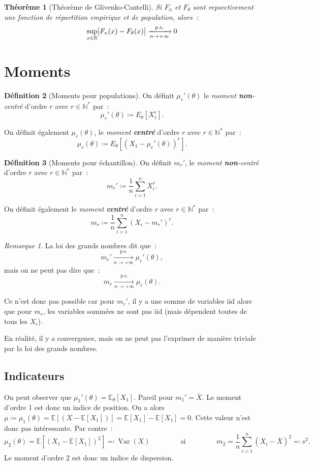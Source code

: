 \documentclass{report}
\DeclareMathOperator{\Var}{Var}
\newcommand{\E}{\mathbb E}
\newcommand{\pinfty}{{+\infty}}
\newcommand{\cvgps}{\xrightarrow[n \to \pinfty]{\text{p.s.}}}
\newcommand{\N}{\mathbb N}
\newcommand{\Ns}{\N^{*}}
\newcommand{\R}{\mathbb R}
\newtheorem{thm}{Théorème}[chapter]
\theoremstyle{definition}
\newtheorem{déf}[thm]{Définition}
\theoremstyle{remark}
\newtheorem*{rmq}{Remarque}
\begin{document}
		\begin{thm}[Théorème de Glivenko-Cantelli] Si $F_n$ et $F_\theta$ sont repsectivement une fonction de répartition empirique et de population, alors~:
		\[\sup_{x \in \R}\abs {F_n(x) - F_\theta(x)} \cvgps 0\]
		\end{thm}
	
	\section{Moments}
		\begin{déf}[Moments pour populations] On définit $\mu_r'(\theta)$ le \textit{moment \textbf{non}-centré} d'ordre $r$ avec $r \in \Ns$ par~:
		\[\mu_r'(\theta) \coloneqq E_\theta[X_1^r].\]

		On définit également $\mu_r(\theta)$, le \textit{moment \textbf{centré}} d'ordre $r$ avec $r \in \Ns$ par~:
		\[\mu_r(\theta) \coloneqq E_\theta\left[\left(X_1 - \mu_r'(\theta)\right)^r\right].\]
		\end{déf}

		\begin{déf}[Moments pour échantillon] On définit $m_r'$, le \textit{moment \textbf{non}-centré} d'ordre $r$ avec $r \in \Ns$ par~:
		\[m_r' \coloneqq \frac 1n\sum_{i=1}^n X_i^r.\]

		On définit également le \textit{moment \textbf{centré}} d'ordre $r$ avec $r \in \Ns$ par~:
		\[m_r \coloneqq \frac 1n\sum_{i=1}^n\left(X_i - m_r'\right)^r.\]
		\end{déf}

		\begin{rmq} La loi des grands nombres dit que~:
		\[m_r' \cvgps \mu_r'(\theta),\]
		mais on ne peut pas dire que~:
		\[m_r \cvgps \mu_r(\theta).\]

		Ce n'est donc pas possible car pour $m_r'$, il y a une somme de variables iid alors que pour $m_r$, les variables sommées ne sont pas iid (mais
		dépendent toutes de tous les $X_i$).
		
		En réalité, il y a convergence, mais on ne peut pas l'exprimer de manière triviale par la loi des grands nombres. \end{rmq}

		\subsection{Indicateurs}
			On peut observer que $\mu_1'(\theta) = \E_\theta[X_1]$. Pareil pour $m_1' = \overline X$. Le moment d'ordre 1 est donc un indice de position.
			On a alors $\mu \coloneqq \mu_1(\theta) = \E[(X - \E[X_1])] = \E[X_1] - \E[X_1] = 0$. Cette valeur n'est donc pas intéressante. Par contre~:
			\[\mu_2(\theta) = \E\left[(X_1 - \E[X_1])^2\right] \eqqcolon \Var(X) \qquad\qquad \text{ si }
				\qquad\qquad m_2 = \frac 1n\sum_{i=1}^n\left(X_i - \overline X\right)^2 \eqqcolon s^2.\]
			Le moment d'ordre 2 est donc un indice de dispersion.
\end{document}
